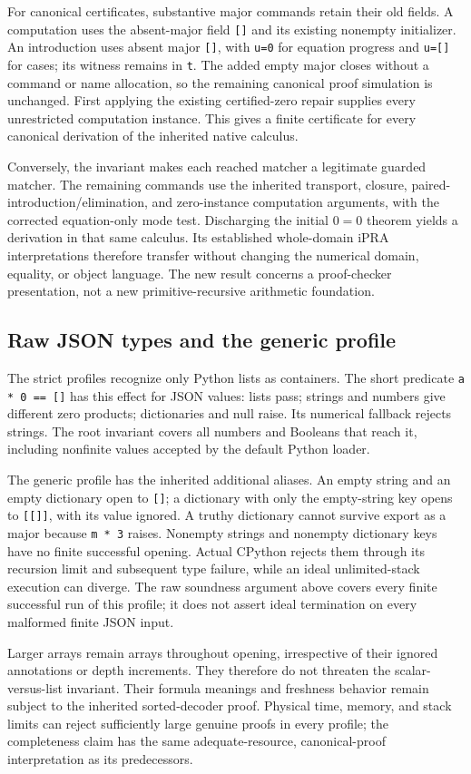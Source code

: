 For canonical certificates, substantive major commands retain their
old fields.  A computation uses the absent-major field \texttt{[]} and
its existing nonempty initializer.  An introduction uses absent major
\texttt{[]}, with \texttt{u=0} for equation progress and
\texttt{u=[]} for cases; its witness remains in \texttt{t}.
The added empty major closes without a command or name allocation, so
the remaining canonical proof simulation is unchanged.  First applying
the existing certified-zero repair supplies every unrestricted
computation instance.  This gives a finite certificate for every
canonical derivation of the inherited native calculus.

Conversely, the invariant makes each reached matcher a legitimate
guarded matcher.  The remaining commands use the inherited
transport, closure, paired-introduction/elimination, and zero-instance
computation arguments, with the corrected equation-only mode test.
Discharging the initial $0=0$ theorem yields a derivation in that same
calculus.  Its established whole-domain iPRA interpretations therefore
transfer without changing the numerical domain, equality, or object
language.  The new result concerns a proof-checker presentation, not a
new primitive-recursive arithmetic foundation.

\subsection{Raw JSON types and the generic profile}

The strict profiles recognize only Python lists as containers.  The
short predicate \texttt{a * 0 == []} has this effect for JSON values:
lists pass; strings and numbers give different zero products;
dictionaries and null raise.  Its numerical fallback rejects strings.
The root invariant covers all numbers and Booleans that reach it,
including nonfinite values accepted by the default Python loader.

The generic profile has the inherited additional aliases.  An empty
string and an empty dictionary open to \texttt{[]}; a dictionary with
only the empty-string key opens to \texttt{[[]]}, with its value ignored.
A truthy dictionary cannot survive export as a major because
\texttt{m * 3} raises.  Nonempty strings and nonempty dictionary keys
have no finite successful opening.  Actual CPython rejects them through
its recursion limit and subsequent type failure, while an ideal
unlimited-stack execution can diverge.  The raw soundness argument
above covers every finite successful run of this profile; it does not
assert ideal termination on every malformed finite JSON input.

Larger arrays remain arrays throughout opening, irrespective of their
ignored annotations or depth increments.  They therefore do not
threaten the scalar-versus-list invariant.  Their formula meanings and
freshness behavior remain subject to the inherited sorted-decoder
proof.  Physical time, memory, and stack limits can reject sufficiently
large genuine proofs in every profile; the completeness claim has the
same adequate-resource, canonical-proof interpretation as its
predecessors.

